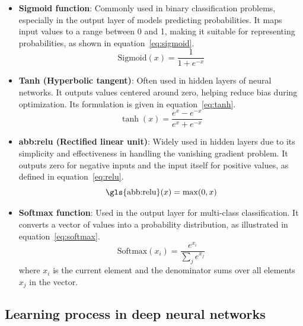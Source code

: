 \begin{itemize}
    \item \textbf{Sigmoid function}: Commonly used in binary classification problems, especially in the output layer of models predicting probabilities. It maps input values to a range between 0 and 1, making it suitable for representing probabilities, as shown in equation~\ref{eq:sigmoid}.
    \begin{equation}
        \text{Sigmoid}(x) = \frac{1}{1 + e^{-x}}
        \label{eq:sigmoid}
    \end{equation}
    
    \item \textbf{Tanh (Hyperbolic tangent)}: Often used in hidden layers of neural networks. It outputs values centered around zero, helping reduce bias during optimization. Its formulation is given in equation~\ref{eq:tanh}.
    \begin{equation}
        \tanh(x) = \frac{e^{x} - e^{-x}}{e^{x} + e^{-x}}
        \label{eq:tanh}
    \end{equation}

    \item \textbf{\gls{abb:relu} (Rectified linear unit)}: Widely used in hidden layers due to its simplicity and effectiveness in handling the vanishing gradient problem. It outputs zero for negative inputs and the input itself for positive values, as defined in equation~\ref{eq:relu}.
    \begin{equation}
        \text{\gls{abb:relu}}(x) = \max(0, x)
        \label{eq:relu}
    \end{equation}

    \item \textbf{Softmax function}: Used in the output layer for multi-class classification. It converts a vector of values into a probability distribution, as illustrated in equation~\ref{eq:softmax}.
    \begin{equation}
        \text{Softmax}(x_i) = \frac{e^{x_i}}{\sum_j e^{x_j}}
        \label{eq:softmax}
    \end{equation}
    where $x_i$ is the current element and the denominator sums over all elements $x_j$ in the vector.
\end{itemize}


    
\subsection{Learning process in deep neural networks}

